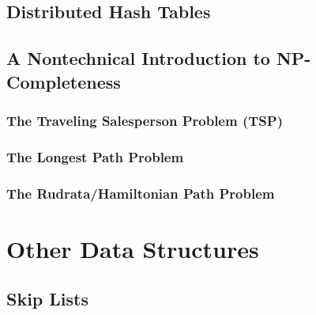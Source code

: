 \documentclass[10pt,a4paper]{book}
\begin{document}
\section{Distributed Hash Tables}





\section{A Nontechnical Introduction to NP-Completeness}

\subsection{The Traveling Salesperson Problem (TSP)}
\subsection{The Longest Path Problem}
\subsection{The Rudrata/Hamiltonian Path Problem}
\chapter{Other Data Structures}
\section{Skip Lists}
\end{document}
